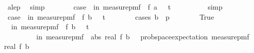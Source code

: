 \begin{isabellebody}
\ a{\isacharunderscore}{\kern0pt}le{\isacharunderscore}{\kern0pt}p\ \isamarkupfalse%
\ simp\isanewline
\ \ \ \ \isamarkupfalse%
\ \isamarkupfalse%
\ case{\isacharunderscore}{\kern0pt}{}{\isacharcolon}{\kern0pt}\ {\isachardoublequoteopen}{\isasymP}{\isacharparenleft}{\kern0pt}{\isasymomega}\ in\ measure{\isacharunderscore}{\kern0pt}pmf\ {\isasymOmega}\ f\ a\ {\isasymomega}\ {\isasymge}\ t{\isacharparenright}{\kern0pt}\ {\isasymle}\ {}{\isacharslash}{\kern0pt}{}{\isachardoublequoteclose}\isanewline
\ \ \ \ \ \ \isamarkupfalse%
\ simp\isanewline
\isanewline
\ \ \ \ \isamarkupfalse%
\ case{\isacharunderscore}{\kern0pt}{}{\isacharcolon}{\kern0pt}\ {\isachardoublequoteopen}{\isasymP}{\isacharparenleft}{\kern0pt}{\isasymomega}\ in\ measure{\isacharunderscore}{\kern0pt}pmf\ {\isasymOmega}\ f\ b\ {\isasymomega}\ {\isacharless}{\kern0pt}\ t{\isacharparenright}{\kern0pt}\ {\isasymle}\ {}{\isacharslash}{\kern0pt}{}{\isachardoublequoteclose}\isanewline
\ \ \ \ \isamarkupfalse%
\ {\isacharparenleft}{\kern0pt}cases\ {\isachardoublequoteopen}b\ {\isacharless}{\kern0pt}\ p{\isachardoublequoteclose}{\isacharparenright}{\kern0pt}\isanewline
\ \ \ \ \ \ \isamarkupfalse%
\ True\isanewline
\ \ \ \ \ \ \isamarkupfalse%
\ {\isachardoublequoteopen}{\isasymP}{\isacharparenleft}{\kern0pt}{\isasymomega}\ in\ measure{\isacharunderscore}{\kern0pt}pmf\ {\isasymOmega}\ f\ b\ {\isasymomega}\ {\isacharless}{\kern0pt}\ t{\isacharparenright}{\kern0pt}\ {\isasymle}\ \isanewline
\ \ \ \ \ \ \ \ {\isasymP}{\isacharparenleft}{\kern0pt}{\isasymomega}\ in\ measure{\isacharunderscore}{\kern0pt}pmf\ {\isasymOmega}\ abs\ {\isacharparenleft}{\kern0pt}real\ {\isacharparenleft}{\kern0pt}f\ b\ {\isasymomega}{\isacharparenright}{\kern0pt}\ {\isacharminus}{\kern0pt}\ prob{\isacharunderscore}{\kern0pt}space{\isachardot}{\kern0pt}expectation\ {\isacharparenleft}{\kern0pt}measure{\isacharunderscore}{\kern0pt}pmf\ {\isasymOmega}\ {\isacharparenleft}{\kern0pt}{\isasymlambda}{\isasymomega}{\isachardot}{\kern0pt}\ real\ {\isacharparenleft}{\kern0pt}f\ b\ {\isasymomega}{\isacharparenright}{\kern0pt}{\isacharparenright}{\kern0pt}{\isacharparenright}{\kern0pt}\ \isanewline

\end{isabellebody}
